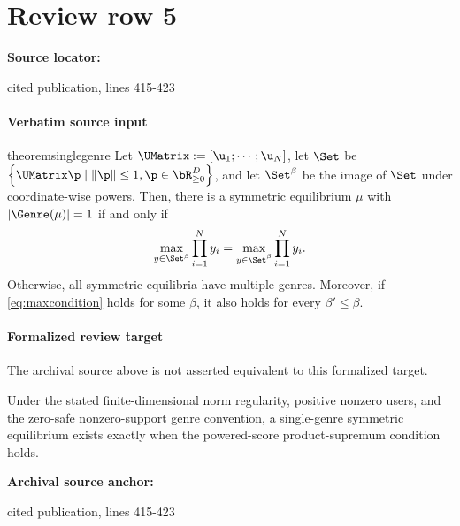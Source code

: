 \documentclass[10pt]{article}
\begin{document}
\section*{Review row 5}
\textbf{Source locator:} {\footnotesize\raggedright cited publication, lines 415-\allowbreak{}423\par}
\paragraph{Verbatim source input}
\begin{ReviewVerbatim}
\begin{restatable}{theorem}{singlegenre}
\label{thm:singlegenre}
Let $\UMatrix := [\u_1; \cdots; \u_N]$, let $\Set$ be $\left\{\UMatrix\p \mid \|\p\| \le 1, \p \in \bR_{\ge 0}^D  \right\}$, and let $\Set^{\beta}$ be the image of $\Set$ under coordinate-wise powers. Then, there is a symmetric equilibrium $\mu$ with $|\Genre(\mu)| = 1$ if and only if
\begin{equation}
\label{eq:maxcondition}
  \max_{y \in \Set^{\beta}} \prod_{i=1}^{N} y_i  = \max_{y \in \bar{\Set}^{\beta}} \prod_{i=1}^{N} y_i.
\end{equation}
Otherwise, all symmetric equilibria have multiple genres. Moreover, if \eqref{eq:maxcondition} holds for some $\beta$, it also holds for every $\beta' \leq \beta$.
\end{restatable}
\end{ReviewVerbatim}


\paragraph{Formalized review target}
The archival source above is not asserted equivalent to this formalized target.
\begin{ReviewVerbatim}
Under the stated finite-dimensional norm regularity, positive nonzero users, and the zero-safe nonzero-support genre convention, a single-genre symmetric equilibrium exists exactly when the powered-score product-supremum condition holds.
\end{ReviewVerbatim}

\textbf{Archival source anchor:} {\footnotesize\raggedright cited publication, lines 415-\allowbreak{}423\par}
\end{document}
